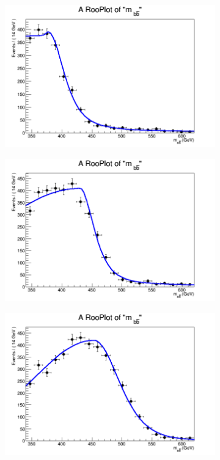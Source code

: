 \begin{figure}[phtb!]
  \begin{center}
  \begin{subfigure}[$m_{A}=400$ GeV]{0.4\textwidth}\includegraphics[width=\textwidth]{FitResults/images/fitMC_bAbb400_2.png}\end{subfigure}
  \begin{subfigure}[$m_{A}=450$ GeV]{0.4\textwidth}\includegraphics[width=\textwidth]{FitResults/images/fitMC_bAbb450_2.png}\end{subfigure}
  \begin{subfigure}[$m_{A}=500$ GeV]{0.4\textwidth}\includegraphics[width=\textwidth]{FitResults/images/fitMC_bAbb500_2.png}\end{subfigure}

\end{center}
\end{figure}
